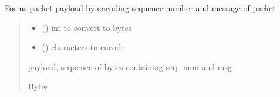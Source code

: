 \documentclass[letterpaper,10pt,oneside,english,openany]{sphinxmanual}
\begin{document}

\begin{fulllineitems}
\label{\detokenize{modules:sender_rdt.make_sender_payload}}
\pysigstartsignatures
\pysiglinewithargsret
{}
{\sphinxparamcomma {}\sphinxparamcomma {}}
{}
\pysigstopsignatures
\sphinxAtStartPar
Forms packet payload by encoding sequence number and message of packet
\begin{quote}\begin{description}
\begin{itemize}
\item {} 
\sphinxAtStartPar
{} () \textendash{} int to convert to bytes

\item {} 
\sphinxAtStartPar
{} () \textendash{} characters to encode

\end{itemize}

\sphinxAtStartPar
payload, sequence of bytes containing seq\_num and msg

\sphinxAtStartPar
Bytes

\end{description}\end{quote}

\end{fulllineitems}

\end{document}
